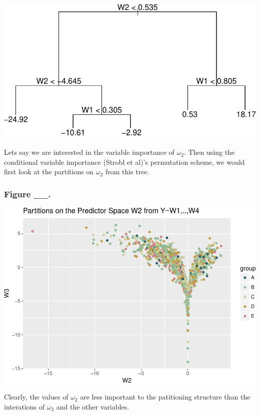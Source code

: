 \documentclass[12pt,twoside]{reedthesis}
\begin{document}
  \begin{center}\includegraphics{Thesis_files/figure-latex/unnamed-chunk-4-1} \end{center}
  
  Lets say we are interested in the variable importance of \(\omega_2\).
  Then using the conditional variable importance (Strobl et al)'s
  permutation scheme, we would first look at the partitions on
  \(\omega_2\) from this tree.
  
  \subsubsection{Figure \_\_.}\label{figure-__.}
  
  \begin{center}\includegraphics{Thesis_files/figure-latex/unnamed-chunk-5-1} \end{center}
  
  Clearly, the values of \(\omega_2\) are less important to the
  patitioning structure than the interations of \(\omega_2\) and the other
  variables.
  
\end{document}

